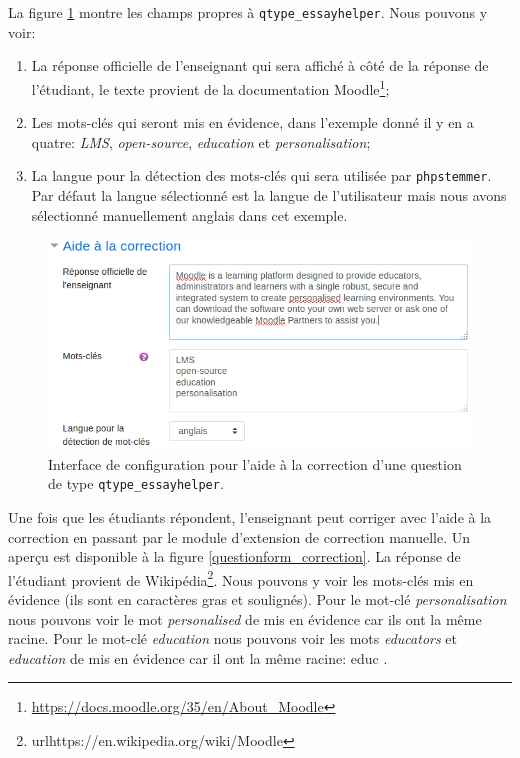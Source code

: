 La figure \ref{questionform_helper} montre les champs propres \`a \texttt{qtype\_essayhelper}.
Nous pouvons y voir:
\begin{enumerate}
  \item La r\'eponse officielle de l'enseignant qui sera affich\'e \`a c\^ot\'e de la r\'eponse de l'\'etudiant, le texte provient de la documentation Moodle\footnote{\url{https://docs.moodle.org/35/en/About_Moodle}};
  \item Les mots-cl\'es qui seront mis en \'evidence, dans l'exemple donn\'e il y en a quatre: \textit{LMS}, \textit{open-source}, \textit{education} et \textit{personalisation};
  \item La langue pour la d\'etection des mots-cl\'es qui sera utilis\'ee par \texttt{phpstemmer}.
    Par d\'efaut la langue s\'electionn\'e est la langue de l'utilisateur mais nous avons s\'electionn\'e manuellement anglais dans cet exemple.
\end{enumerate}
\begin{figure}[htbp]
  \includegraphics[scale=0.85]{images/questionform_helper.png}
  \caption{Interface de configuration pour l'aide \`a la correction d'une question de type \texttt{qtype\_essayhelper}.}
  \label{questionform_helper}
\end{figure}

Une fois que les \'etudiants r\'epondent, l'enseignant peut corriger avec l'aide \`a la correction en passant par le module d'extension de correction manuelle.
Un aperçu est disponible \`a la figure \ref{questionform_correction}.
La r\'eponse de l'\'etudiant provient de Wikip\'edia\footnote{url{https://en.wikipedia.org/wiki/Moodle}}.
Nous pouvons y voir les mots-cl\'es mis en \'evidence (ils sont en caract\`eres gras et soulign\'es).
Pour le mot-cl\'e \textit{personalisation} nous pouvons voir le mot \textit{personalised} de mis en \'evidence car ils ont la m\^eme racine.
Pour le mot-cl\'e \textit{education} nous pouvons voir les mots \textit{educators} et \textit{education} de mis en \'evidence car il ont la m\^eme racine: \og educ \fg{} .

